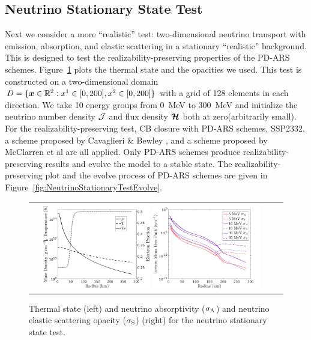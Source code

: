 \subsection{Neutrino Stationary State Test} \label{se: Neutrino Stationary State Test}
Next we consider a more ``realistic'' test: two-dimensional neutrino transport with emission, absorption, and elastic scattering in a stationary ``realistic'' background.
This is designed to test the realizability-preserving properties of the PD-ARS schemes.
Figure~\ref{fig:NeutrinoStationaryTestEOS} plots the thermal state and the opacities we used.
This test is constructed on a two-dimensional domain $D=\{\boldsymbol{x}\in\mathbb{R}^{2}:x^{1}\in[0,200], x^{2}\in[0,200]\}$ with a grid of 128 elements in each direction.
We take 10 energy groups from 0~MeV to 300~MeV and initialize the neutrino number density $\mathcal{J}$ and flux density $\boldsymbol{\mathcal{H}}$ both at zero(arbitrarily small).
For the realizability-preserving test, CB closure with PD-ARS schemes, SSP2332, a scheme proposed by Cavaglieri \& Bewley \cite{cavaglieriBewley2015}, and a scheme proposed by McClarren et al \cite{mcclarren_etal_2008} are all applied.
Only PD-ARS schemes produce realizability-preserving results and evolve the model to a stable state.
The realizability-preserving plot and the evolve process of PD-ARS schemes are given in Figure~\ref{fig:NeutrinoStationaryTestEvolve}. 

\begin{figure}[h]
  \centering
  \begin{tabular}{cc}
    \includegraphics[width=0.45\textwidth]{figures/NStatinaryS_EOS}
    \includegraphics[width=0.45\textwidth]{figures/NSS_Opacities}
  \end{tabular}
   \caption{Thermal state (left) and neutrino absorptivity ($\sigma_{{\rm A}}$) and neutrino elastic scattering opacity ($ \sigma_{{\rm S}}$) (right) for the neutrino stationary state test.}
   \label{fig:NeutrinoStationaryTestEOS}
\end{figure}

